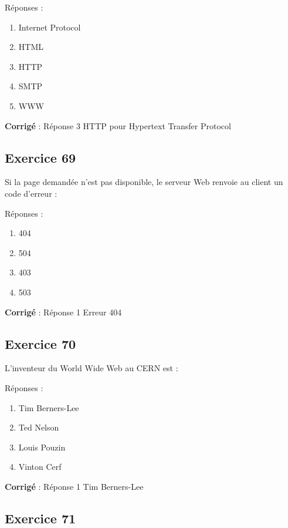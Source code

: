 \documentclass[11pt]{article}
\providecommand{\tightlist}{%
      \setlength{\itemsep}{0pt}\setlength{\parskip}{0pt}}
\begin{document}
Réponses :

\begin{enumerate}
\def\labelenumi{\arabic{enumi}.}
\tightlist
\item
  Internet Protocol
\item
  HTML
\item
  HTTP
\item
  SMTP
\item
  WWW
\end{enumerate}

    \textbf{Corrigé} : Réponse 3 HTTP pour Hypertext Transfer Protocol

    \hypertarget{exercice-69}{%
\subsection{Exercice 69}\label{exercice-69}}

Si la page demandée n'est pas disponible, le serveur Web renvoie au
client un code d'erreur :

Réponses :

\begin{enumerate}
\def\labelenumi{\arabic{enumi}.}
\item
  404
\item
  504
\item
  403
\item
  503
\end{enumerate}

    \textbf{Corrigé} : Réponse 1 Erreur 404

    \hypertarget{exercice-70}{%
\subsection{Exercice 70}\label{exercice-70}}

L'inventeur du World Wide Web au CERN est :

Réponses :

\begin{enumerate}
\def\labelenumi{\arabic{enumi}.}
\item
  Tim Berners-Lee
\item
  Ted Nelson
\item
  Louis Pouzin
\item
  Vinton Cerf
\end{enumerate}

    \textbf{Corrigé} : Réponse 1 Tim Berners-Lee

    \hypertarget{exercice-71}{%
\subsection{Exercice 71}\label{exercice-71}}
\end{document}
